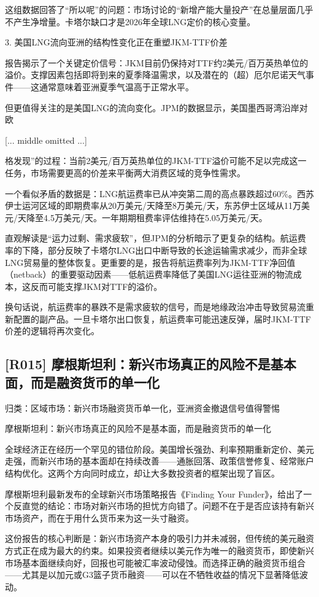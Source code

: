 \documentclass[11pt]{ctexart}
\begin{document}
这组数据回答了“所以呢”的问题：市场讨论的“新增产能大量投产”在总量层面几乎不产生净增量。卡塔尔缺口才是2026年全球LNG定价的核心变量。

3. 美国LNG流向亚洲的结构性变化正在重塑JKM-TTF价差

报告揭示了一个关键定价信号：JKM目前仍保持对TTF约2美元/百万英热单位的溢价。支撑因素包括即将到来的夏季降温需求，以及潜在的（超）厄尔尼诺天气事件——这通常意味着亚洲夏季气温高于正常水平。

但更值得关注的是美国LNG的流向变化。JPM的数据显示，美国墨西哥湾沿岸对欧

[... middle omitted ...]

格发现”的过程：当前2美元/百万英热单位的JKM-TTF溢价可能不足以完成这一任务，市场需要更高的价差来平衡两大消费区域的竞争性需求。

一个看似矛盾的数据是：LNG航运费率已从冲突第二周的高点暴跌超过60\%。西苏伊士运河区域的即期费率从20万美元/天降至8万美元/天，东苏伊士区域从11万美元/天降至4.5万美元/天。一年期期租费率评估维持在5.05万美元/天。

直观解读是“运力过剩、需求疲软”，但JPM的分析暗示了更复杂的结构。航运费率的下降，部分反映了卡塔尔LNG出口中断导致的长途运输需求减少，而非全球LNG贸易量的整体恢复。更重要的是，报告将航运费率列为JKM-TTF净回值（netback）的重要驱动因素——低航运费率降低了美国LNG运往亚洲的物流成本，这反而可能支撑JKM对TTF的溢价。

换句话说，航运费率的暴跌不是需求疲软的信号，而是地缘政治冲击导致贸易流重新配置的副产品。一旦卡塔尔出口恢复，航运费率可能迅速反弹，届时JKM-TTF价差的逻辑将再次变化。

\subsection{[R015] 摩根斯坦利：新兴市场真正的风险不是基本面，而是融资货币的单一化}
{\small\color{refgray}归类：区域市场：新兴市场融资货币单一化，亚洲资金撤退信号值得警惕}

摩根斯坦利：新兴市场真正的风险不是基本面，而是融资货币的单一化

全球经济正在经历一个罕见的错位阶段。美国增长强劲、利率预期重新定价、美元走强，而新兴市场的基本面却在持续改善——通胀回落、政策信誉修复、经常账户结构优化。这两个方向同时成立，却让大多数投资者的框架出现了盲区。

摩根斯坦利最新发布的全球新兴市场策略报告《Finding Your Funder》，给出了一个反直觉的结论：市场对新兴市场的担忧方向错了。问题不在于是否应该持有新兴市场资产，而在于用什么货币来为这一头寸融资。

这份报告的核心判断是：新兴市场资产本身的吸引力并未减弱，但传统的美元融资方式正在成为最大的约束。如果投资者继续以美元作为唯一的融资货币，即使新兴市场基本面继续向好，回报也可能被汇率波动侵蚀。而选择正确的融资货币组合——尤其是以加元或G3篮子货币融资——可以在不牺牲收益的情况下显著降低波动。
\end{document}
